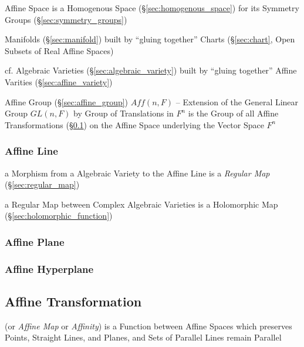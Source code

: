 Affine Space is a Homogenous Space (\S\ref{sec:homogenous_space}) for its
Symmetry Groups (\S\ref{sec:symmetry_groups})

Manifolds (\S\ref{sec:manifold}) built by ``gluing together'' Charts
(\S\ref{sec:chart}, Open Subsets of Real Affine Spaces)

cf. Algebraic Varieties (\S\ref{sec:algebraic_variety}) built by ``gluing
together'' Affine Varities (\S\ref{sec:affine_variety})

Affine Group (\S\ref{sec:affine_group}) $Aff(n,F)$ -- Extension of the General
Linear Group $GL(n,F)$ by Group of Translations in $F^n$ is the Group of all
Affine Transformations (\S\ref{sec:affine_transformation}) on the Affine Space
underlying the Vector Space $F^n$



\subsubsection{Affine Line}\label{sec:affine_line}

a Morphism from a Algebraic Variety to the Affine Line is a \emph{Regular Map}
(\S\ref{sec:regular_map})

a Regular Map between Complex Algebraic Varieties is a Holomorphic Map
(\S\ref{sec:holomorphic_function})



\subsubsection{Affine Plane}\label{sec:affine_plane}

\subsubsection{Affine Hyperplane}\label{sec:affine_hyperplane}



\subsection{Affine Transformation}\label{sec:affine_transformation}

(or \emph{Affine Map} or \emph{Affinity}) is a Function between Affine
Spaces which preserves Points, Straight Lines, and Planes, and Sets of
Parallel Lines remain Parallel

